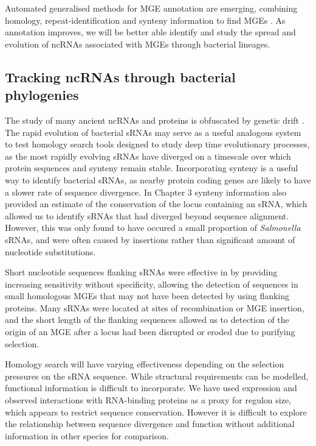 Automated generalised methods for MGE annotation are emerging, combining homology, repeat-identification and synteny information to find MGEs \citep{Berthelier2018-sd}. As annotation improves, we will be better able identify and study the spread and evolution of ncRNAs associated with MGEs through bacterial lineages.

\subsection{Tracking ncRNAs through bacterial phylogenies}

The study of many ancient ncRNAs and proteins is obfuscated by genetic drift \citep{Hoeppner2012-llpl}. The rapid evolution of bacterial sRNAs may serve as a useful analogous system to test homology search tools designed to study deep time evolutionary processes, as the most rapidly evolving sRNAs have diverged on a timescale over which protein sequences and synteny remain stable. 
Incorporating synteny is a useful way to identify bacterial sRNAs, as nearby protein coding genes are likely to have a slower rate of sequence divergence. In Chapter 3 synteny information also provided an estimate of the conservation of the locus containing an sRNA, which allowed us to identify sRNAs that had diverged beyond sequence alignment. However, this was only found to have occured a small proportion of \textit{Salmonella} sRNAs, and were often caused by insertions rather than significant amount of nucleotide substitutions.

Short nucleotide sequences flanking sRNAs were effective in by providing increasing sensitivity without specificity, allowing the detection of sequences in small homologous MGEs that may not have been detected by using flanking proteins. Many sRNAs were located at sites of recombination or MGE insertion, and the short length of the flanking sequences allowed us to detection of the origin of an MGE after a locus had been disrupted or eroded due to purifying selection. 

Homology search will have varying effectiveness depending on the selection pressures on the sRNA sequence. While structural requirements can be modelled, functional information is difficult to incorporate. We have used expression and observed interactions with RNA-binding proteins as a proxy for regulon size, which appears to restrict sequence conservation. However it is difficult to explore the relationship between sequence divergence and function without additional information in other species for comparison.

